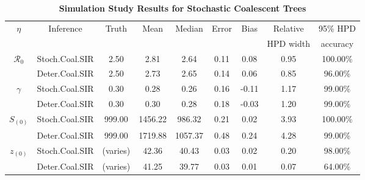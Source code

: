 \documentclass[10pt]{article}
\begin{document}
\begin{table}[!ht]
\begin{center}
\caption{\bf{Simulation Study Results for Stochastic Coalescent Trees}}
\begin{tabular}{|c|c|c|c|c|c|c|c|c|}
\hline
$\eta$ & Inference & Truth & Mean & Median & Error & Bias & Relative & 95\% HPD \\ 
&  &  &  &  &  &  &  HPD width & accuracy \\ 
	\hline
	\hline
$\mathcal{R}_0$ & Stoch.Coal.SIR & 2.50 & 2.81 & 2.64 & 0.11 & 0.08 & 0.95 & 100.00\% \\
& Deter.Coal.SIR & 2.50 & 2.73 & 2.65 & 0.14 & 0.06 & 0.85 & 96.00\% \\
   \hline
   \hline 
$\gamma$ & Stoch.Coal.SIR & 0.30 & 0.28 & 0.26 & 0.16 & -0.11 & 1.17 & 99.00\% \\
& Deter.Coal.SIR & 0.30 & 0.30 & 0.28 & 0.18 & -0.03 & 1.20 & 99.00\% \\
   \hline
   \hline
$S_{(0)}$ & Stoch.Coal.SIR & 999.00 & 1456.22 & 986.32 & 0.21 & 0.02 & 3.93 & 100.00\% \\
& Deter.Coal.SIR & 999.00 & 1719.88 & 1057.37 & 0.48 & 0.24 & 4.28 & 99.00\% \\
   \hline
   \hline
$z_{(0)}$ & Stoch.Coal.SIR & (varies) & 42.36 & 40.43 & 0.03 & 0.02 & 0.20 & 98.00\% \\
& Deter.Coal.SIR & (varies) & 41.25 & 39.77 & 0.03 & 0.01 & 0.07 & 64.00\% \\ 
   \hline
\end{tabular}
\end{center}
\label{table:simStochCoalTrees}
 \end{table}
\end{document}
